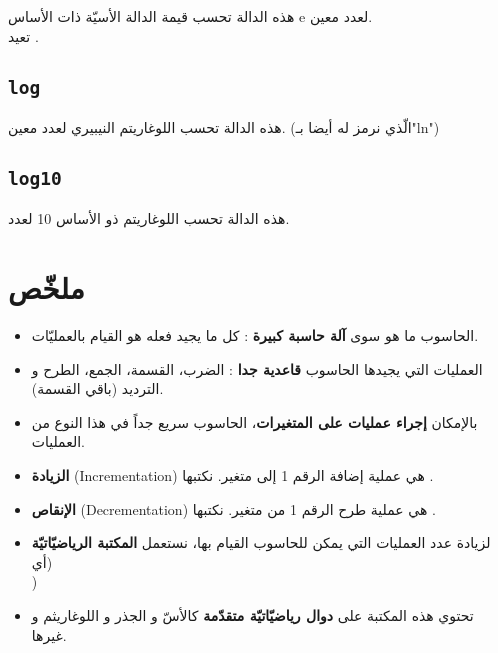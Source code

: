 هذه الدالة تحسب قيمة الدالة الأسيّة ذات الأساس
\textenglish{e}
لعدد معين.\\
تعيد
.

\subsection{\texttt{log}}

هذه الدالة تحسب اللوغاريتم النيبيري لعدد معين. (الّذي نرمز له أيضا بـ"\textenglish{ln}")

\subsection{\texttt{log10}}

هذه الدالة تحسب اللوغاريتم ذو الأساس 10 لعدد.

\section*{ملخّص}

\begin{itemize}
  \item الحاسوب ما هو سوى
\textbf{آلة حاسبة كبيرة}
: كل ما يجيد فعله هو القيام بالعمليّات.
  \item العمليات التي يجيدها الحاسوب
\textbf{قاعدية جدا}
: الضرب، القسمة، الجمع، الطرح و الترديد (باقي القسمة).
  \item بالإمكان
\textbf{إجراء عمليات على المتغيرات}،
الحاسوب سريع جداً في هذا النوع من العمليات.
  \item \textbf{الزيادة}
(\textenglish{Incrementation})
هي عملية إضافة الرقم 1 إلى متغير. نكتبها
.
  \item \textbf{الإنقاص}
(\textenglish{Decrementation})
هي عملية طرح الرقم 1 من متغير. نكتبها
.
  \item لزيادة عدد العمليات التي يمكن للحاسوب القيام بها، نستعمل
\textbf{المكتبة الرياضيّاتيّة}
(أي\\
)
  \item تحتوي هذه المكتبة على
\textbf{دوال رياضيّاتيّة متقدّمة}
كالأسّ و الجذر و اللوغاريثم و غيرها.
\end{itemize}
